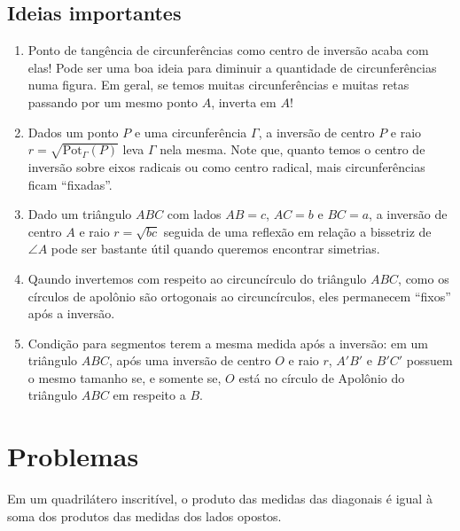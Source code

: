\documentclass[final, 10pt, a4paper]{article}
\begin{document}
	\subsection{Ideias importantes}

	\begin{enumerate}[label = {--}]
		\item Ponto de tangência de circunferências como centro de inversão acaba com elas! Pode ser uma boa ideia para diminuir a quantidade de circunferências numa figura. Em geral, se temos muitas circunferências e muitas retas passando por um mesmo ponto $A$, inverta em $A$!

		\item Dados um ponto $P$ e uma circunferência $\Gamma$, a inversão de centro $P$ e raio $r = \sqrt{\mathrm{Pot}_\Gamma(P)}$ leva $\Gamma$ nela mesma. Note que, quanto temos o centro de inversão sobre eixos radicais ou como centro radical, mais circunferências ficam ``fixadas''.	 

		\item Dado um triângulo $ABC$ com lados $AB = c$, $AC = b$ e $BC = a$, a inversão de centro $A$ e raio $r = \sqrt{bc}$ seguida de uma reflexão em relação a bissetriz de $\angle A$ pode ser bastante útil quando queremos encontrar simetrias.

		\item Qaundo invertemos com respeito ao circuncírculo do triângulo $ABC$, como os círculos de apolônio são ortogonais ao circuncírculos, eles permanecem ``fixos'' após a inversão.

		\item Condição para segmentos terem a mesma medida após a inversão: em um triângulo $ABC$, após uma inversão de centro $O$ e raio $r$, $A'B'$ e $B'C'$ possuem o mesmo tamanho se, e somente se, $O$ está no círculo de Apolônio do triângulo $ABC$ em respeito a $B$.

	\end{enumerate}

	\section{Problemas}
	\begin{prob}
		Em um quadrilátero inscritível, o produto das medidas das diagonais é igual à soma dos produtos das medidas dos lados opostos.
	\end{prob}
	
\end{document}
